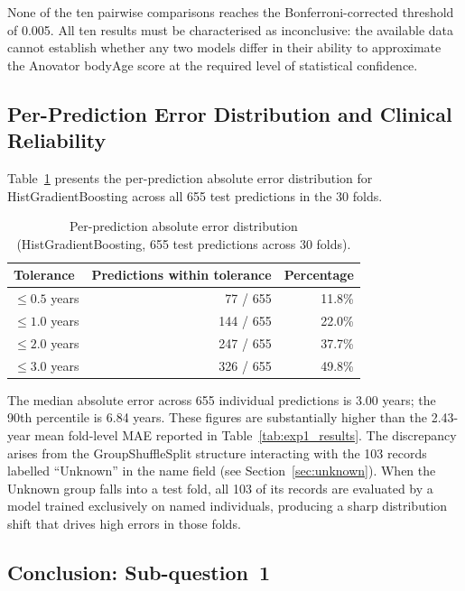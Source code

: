 \documentclass[11pt,a4paper]{report}
\begin{document}
None of the ten pairwise comparisons reaches the Bonferroni-corrected threshold of 0.005. All ten
results must be characterised as inconclusive: the available data cannot establish whether any two
models differ in their ability to approximate the Anovator bodyAge score at the required level of
statistical confidence.

\subsection{Per-Prediction Error Distribution and Clinical Reliability}
\label{sec:pred_err}

Table~\ref{tab:exp1_reliability} presents the per-prediction absolute error distribution for
HistGradientBoosting across all 655 test predictions in the 30 folds.

\begin{table}[h]
  \centering
  \caption{Per-prediction absolute error distribution (HistGradientBoosting, 655 test predictions
  across 30 folds).}
  \label{tab:exp1_reliability}
  \begin{tabular}{lrr}
    \toprule
    \textbf{Tolerance} & \textbf{Predictions within tolerance} & \textbf{Percentage} \\
    \midrule
    $\leq 0.5$ years & 77 / 655  & 11.8\% \\
    $\leq 1.0$ years & 144 / 655 & 22.0\% \\
    $\leq 2.0$ years & 247 / 655 & 37.7\% \\
    $\leq 3.0$ years & 326 / 655 & 49.8\% \\
    \bottomrule
  \end{tabular}
\end{table}

The median absolute error across 655 individual predictions is 3.00 years; the 90th percentile is
6.84 years. These figures are substantially higher than the 2.43-year mean fold-level MAE reported
in Table~\ref{tab:exp1_results}. The discrepancy arises from the GroupShuffleSplit structure
interacting with the 103 records labelled ``Unknown'' in the name field (see
Section~\ref{sec:unknown}). When the Unknown group falls into a test fold, all 103 of its records
are evaluated by a model trained exclusively on named individuals, producing a sharp distribution
shift that drives high errors in those folds.

\subsection{Conclusion: Sub-question~1}
\end{document}
